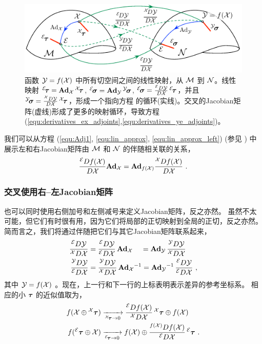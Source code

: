 \begin{figure}[tb]
\centering
\includegraphics{figures/jacobians_adjoints}
\caption{函数 $\cY=f(\cX)$ 中所有切空间之间的线性映射，从 $\cM$ 到 $\cN$。线性映射 ${{^\cE}\!\bftau=\Ad[\cM]{\cX}\,{^\cX}\!\bftau}$, ${{^\cE}\!\bfsigma=\Ad[\cN]{\cY}\,{^\cY}\!\bfsigma}$, ${{^\cE}\!\bfsigma=\ldpar{\cY}{\cX}\,{^\cE}\!\bftau}$，并且 ${{^\cY}\!\bfsigma=\rdpar{\cY}{\cX}\,{^\cX}\!\bftau}$，形成一个指向方程  的循环(实线)。交叉的Jacobian矩阵(虚线)形成了更多的映射循环，导致方程 (\ref{equ:derivatives_ex_adjoints},\ref{equ:derivatives_ye_adjoints})。} 
\label{fig:jacobians_adjoints}
\end{figure}

我们可以从方程 (\ref{equ:Adj1}, \ref{equ:lin_approx}, \ref{equ:lin_approx_left}) (参见 ) 中展示左和右Jacobian矩阵由 $\cM$ 和 $\cN$ 的伴随相关联的关系，
%
\begin{align}\label{equ:derivatives_lr_adjoints}
\ldpar{f(\cX)}{\cX}\Ad[\cM]{\cX} = \Ad[\cN]{f(\cX)}\rdpar{f(\cX)}{\cX} 
~.
\end{align}


\subsubsection{交叉使用右--左Jacobian矩阵}

也可以同时使用右侧加号和左侧减号来定义Jacobian矩阵，反之亦然。
虽然不太可能，但它们有时很有用，因为它们将局部的正切映射到全局的正切，反之亦然。
简而言之，我们将通过伴随把它们与其它Jacobian矩阵联系起来，
%
\begin{align}
\lrdpar{\cY}{\cX} &= \lldpar{\cY}{\cX}\,\Ad{\cX} ~~~\,= \Ad{\cY}\,\rrdpar{\cY}{\cX} \label{equ:derivatives_ex_adjoints}\\
\rldpar{\cY}{\cX} &= \rrdpar{\cY}{\cX}\,\Ad{\cX}\inv = \Ad{\cY}\inv\,\lldpar{\cY}{\cX}\label{equ:derivatives_ye_adjoints}
~,
\end{align}
%
其中 $\cY=f(\cX)$ 。现在，上一行和下一行的上标表明表示差异的参考坐标系。
相应的小 $\bftau$ 的近似值取为，
%
\begin{align}
f(\cX\op{^\cX}\bftau) 
 &\xrightarrow[{^\cX\!\bftau}\to0]{} \lrdpar{f(\cX)}{\cX}\,{^\cX}\bftau \op f(\cX) \label{equ:lin_approx_rl}\\
f({^\cE}\bftau\op\cX) 
 &\xrightarrow[{^\cE\!\bftau}\to0]{} f(\cX) \op \rldpar{f(\cX)}{\cX}\,{^\cE}\bftau \label{equ:lin_approx_lr}
 ~.
\end{align}



